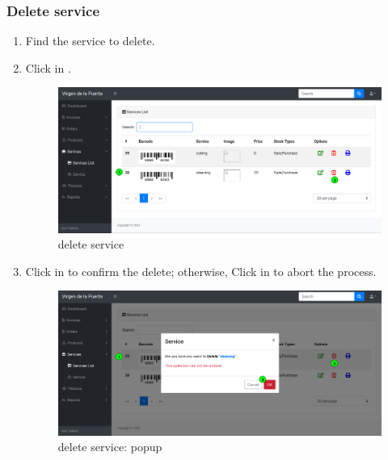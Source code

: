 \documentclass[a4paper,11pt]{refart}
\begin{document}
\subsubsection{Delete service}
\begin{enumerate}
	\item Find the service to delete.
	\item Click in .
	\begin{figure}[H]\centering
		\includegraphics[width=\textwidth]{images/service_list-delete.png}
		\caption{delete service}
		\label{fig:service_list-delete.png}
	\end{figure}
	\item Click in  to confirm the delete; otherwise, Click in  to abort the process.
	\begin{figure}[H]\centering
		\includegraphics[width=\textwidth]{images/service_list-delete-popup.png}
		\caption{delete service: popup}
		\label{fig:service_list-delete-popup.png}
	\end{figure}
\end{enumerate}
\end{document}
